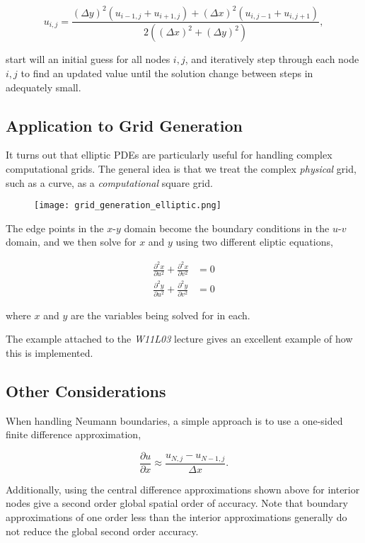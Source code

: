 \documentclass[12pt]{article}
\begin{document}
\vspace{2mm}

$$ u_{i,j} = \frac{(\Delta y)^2 (u_{i-1,j}+u_{i+1,j}) + (\Delta x)^2 (u_{i,j-1}+u_{i,j+1})}{2((\Delta x)^2 + (\Delta y)^2)}, $$

\vspace{4mm}

start will an initial guess for all nodes $i,j$, and iteratively step through each node $i,j$ to find an updated value until the solution change between steps in adequately small.


\subsection{Application to Grid Generation}

It turns out that elliptic PDEs are particularly useful for handling complex computational grids. The general idea is that we treat the complex {\it physical} grid, such as a curve, as a {\it computational} square grid.

\begin{figure}[h!]
\centering
\texttt{[image: grid\_generation\_elliptic.png]}
\end{figure}

The edge points in the $x$-$y$ domain become the boundary conditions in the $u$-$v$ domain, and we then solve for $x$ and $y$ using two different eliptic equations, 

\vspace{2mm}

\begin{align*}
\frac{\partial^2x}{\partial u^2} + \frac{\partial^2x}{\partial v^2} &= 0  \\[0.8em]
\frac{\partial^2y}{\partial u^2} + \frac{\partial^2y}{\partial v^2} &= 0
\end{align*}

\vspace{4mm}

where $x$ and $y$ are the variables being solved for in each.

\vspace{4mm}

The example attached to the {\it W11L03} lecture gives an excellent example of how this is implemented.

\subsection{Other Considerations}

When handling Neumann boundaries, a simple approach is to use a one-sided finite difference approximation,

\vspace{2mm}

$$ \frac{\partial u}{\partial x} \approx \frac{u_{N,j} - u_{N-1,j}}{\Delta x}. $$

\vspace{4mm}

Additionally, using the central difference approximations shown above for interior nodes give a second order global spatial order of accuracy. Note that boundary approximations of one order less than the interior approximations generally do not reduce the global second order accuracy.
\end{document}
